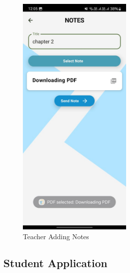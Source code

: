 \begin{figure}[H]
    \centering
    \includegraphics[width=0.5\textwidth]{Graphics/output/teacher_add_notes.jpg}
    \caption{Teacher Adding Notes}
    \label{fig:teacher_add_notes}
\end{figure}

\subsection{Student Application}

